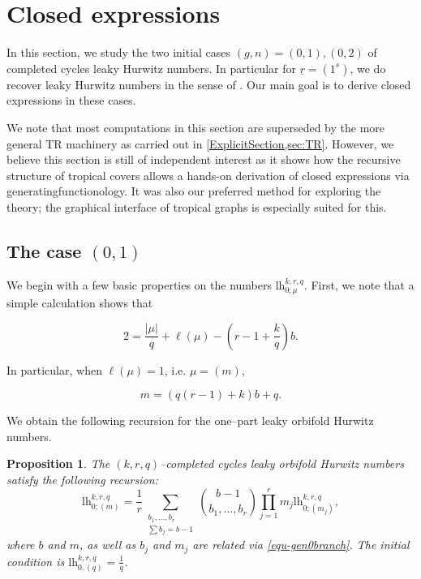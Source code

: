 \documentclass[10pt,a4paper,oneside,no-math,reqno]{amsart}%
\theoremstyle{plain}
\newtheorem{proposition}[theorem]{Proposition}
\theoremstyle{definition}
\theoremstyle{remark}
\numberwithin{equation}{section}
\newcommand{\1}{\mathds{1}}
\newcommand{\<}{\langle}
\renewcommand{\>}{\rangle}
\newcommand{\lh}{\mathord{\mathrm{l\!h}}}
\begin{document}
\section{Closed expressions}
\label{ClosedFormulaeSec}
In this section, we study the two initial cases $(g,n)=(0,1),(0,2)$ of completed cycles leaky Hurwitz numbers. In particular for $\underline{r}=(1^s)$, we do recover leaky Hurwitz numbers in the sense of \cite{CMR25}. Our main goal is to derive closed expressions in these cases.

We note that most computations in this section are superseded by the more general TR machinery as carried out in \cref{ExplicitSection,sec:TR}. However, we believe this section is still of independent interest as it shows how the recursive structure of tropical covers allows a hands-on derivation of closed expressions via generatingfunctionology. It was also our preferred method for exploring the theory; the graphical interface of tropical graphs is especially suited for this.

\subsection{The case \texorpdfstring{$(0,1)$}{(0,1)}}

We begin with a few basic properties on the numbers $\lh^{k,r,q}_{0;\mu}$. First, we note that a simple calculation shows that

\begin{equation}
    2
    =
    \frac{|\mu|}{q}+\ell(\mu)-(r - 1+\frac{k}{q})b.
\end{equation}

In particular, when $\ell(\mu)=1$, i.e. $\mu=(m)$,

\begin{equation}
\label{equ-gen0branch}
    m
    =
    (q(r-1)+k)b+q.
\end{equation}

We obtain the following recursion for the one--part leaky orbifold Hurwitz numbers.

\begin{proposition}\label{01Recursion}
	The $ (k,r,q)$--completed cycles leaky orbifold Hurwitz numbers satisfy the following recursion:
	\begin{equation}
		\lh^{k,r,q}_{0;(m)} 
		=\frac{1}{r}
		\sum_{\substack{b_1, \dotsc, b_{r} \\ \sum b_j = b - 1}} \binom{b - 1}{b_1, \dotsc, b_{r}} \prod_{j=1}^r m_j \lh^{k,r,q}_{0;(m_j)} ,
	\end{equation}
    where $b$ and $m$, as well as $b_j$ and $m_j$ are related via \cref{equ-gen0branch}. The initial condition is $ \lh^{k,r,q}_{0,(q)} = \frac{1}{q}$.
\end{proposition}
\end{document}
